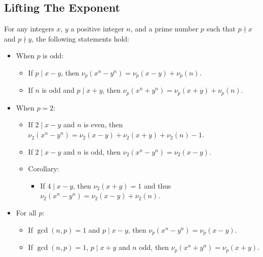 \documentclass[8pt,landscape,a4paper,twocolumn]{article}
\begin{document}
% 

% 
% 

\subsection{Lifting The Exponent}
For any integers $x$, $y$ a positive integer $n$, and a prime number $p$ such that $p \nmid x$ and $p \nmid y$, the following statements hold:

\begin{itemize}
    \item When $p$ is odd:
    \begin{itemize}
        \item If $p \mid x-y$, then $\nu_p(x^n-y^n) = \nu_p(x-y)+\nu_p(n)$.
        \item If $n$ is odd and $p \mid x+y$, then $\nu_p(x^n+y^n) = \nu_p(x+y)+\nu_p(n)$.
    \end{itemize}
    \item When $p = 2$:
    \begin{itemize}
        \item If $2 \mid x-y$ and $n$ is even, then $\nu_2(x^n-y^n) = \nu_2(x-y)+\nu_2(x+y)+\nu_2(n)-1$.
        \item If $2 \mid x-y$ and $n$ is odd, then $\nu_2(x^n-y^n) = \nu_2(x-y)$.
        \item Corollary:
        \begin{itemize}
            \item If $4 \mid x-y$, then $\nu_2(x+y)=1$ and thus $\nu_2(x^n-y^n) = \nu_2(x-y)+\nu_2(n)$.
        \end{itemize}
    \end{itemize}
    \item For all $p$:
    \begin{itemize}
        \item If $\gcd(n,p) = 1$ and $p \mid x-y$, then $\nu_p(x^n-y^n) = \nu_p(x-y)$.
        \item If $\gcd(n,p) = 1$, $p \mid x+y$ and $n$ odd, then $\nu_p(x^n+y^n) = \nu_p(x+y)$.
    \end{itemize}
\end{itemize}
\end{document}
